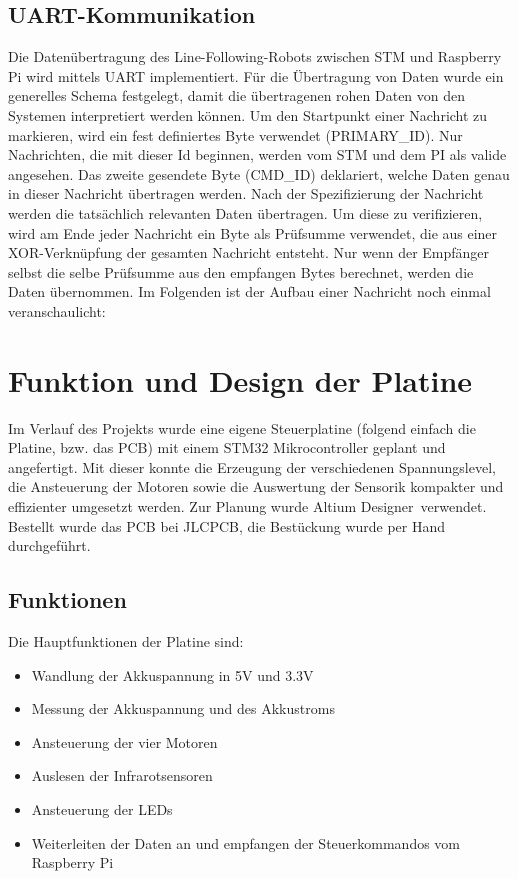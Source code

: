\documentclass[12pt, a4paper]{report}
\begin{document}
\subsection{UART-Kommunikation}\label{uart-code}

Die Datenübertragung des Line-Following-Robots zwischen STM und Raspberry Pi wird mittels UART implementiert. Für die Übertragung von Daten wurde ein generelles Schema festgelegt, damit die übertragenen rohen Daten von den Systemen interpretiert werden können. Um den Startpunkt einer Nachricht zu markieren, wird ein fest definiertes Byte verwendet (PRIMARY\_ID). Nur Nachrichten, die mit dieser Id beginnen, werden vom STM und dem PI als valide angesehen. Das zweite gesendete Byte (CMD\_ID) deklariert, welche Daten genau in dieser Nachricht übertragen werden. Nach der Spezifizierung der Nachricht werden die tatsächlich relevanten Daten übertragen. Um diese zu verifizieren, wird am Ende jeder Nachricht ein Byte als Prüfsumme verwendet, die aus einer XOR-Verknüpfung der gesamten Nachricht entsteht. Nur wenn der Empfänger selbst die selbe Prüfsumme aus den empfangen Bytes berechnet, werden die Daten übernommen. Im Folgenden ist der Aufbau einer Nachricht noch einmal veranschaulicht:




\captionsetup{justification=centering,margin=1cm}
\section{Funktion und Design der Platine}\label{sec:Platine}
      Im Verlauf des Projekts wurde eine eigene Steuerplatine (folgend einfach \glqq die Platine\grqq, bzw. \glqq das PCB\grqq) mit
      einem STM32 Mikrocontroller geplant und angefertigt. Mit dieser konnte die Erzeugung der verschiedenen
      Spannungslevel, die Ansteuerung der Motoren sowie die Auswertung der Sensorik kompakter und effizienter umgesetzt werden. Zur
      Planung wurde \glqq Altium Designer\grqq~verwendet. Bestellt wurde das PCB bei JLCPCB, die Bestückung wurde per Hand durchgeführt.
         \subsection{Funktionen}
         Die Hauptfunktionen der Platine sind:
         \begin{itemize}
            \item Wandlung der Akkuspannung in 5V und 3.3V
            \item Messung der Akkuspannung und des Akkustroms
            \item Ansteuerung der vier Motoren
            \item Auslesen der Infrarotsensoren
            \item Ansteuerung der LEDs
            \item Weiterleiten der Daten an und empfangen der Steuerkommandos vom Raspberry Pi
         \end{itemize}
\end{document}
